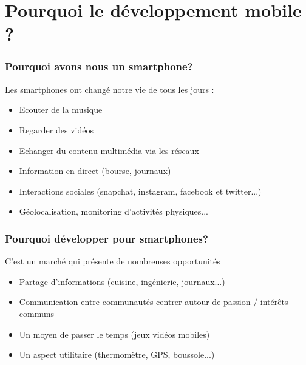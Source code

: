 \documentclass{beamer}
\begin{document}
\section{Pourquoi le développement mobile ?}
\begin{frame}
\frametitle{Pourquoi avons nous un smartphone?}

\begin{block}{Les smartphones ont changé notre vie de tous les jours :}

	\begin{itemize}
		\item Ecouter de la musique
		\item Regarder des vidéos
		\item Echanger du contenu multimédia via les réseaux
		\item Information en direct (bourse, journaux)
		\item Interactions sociales (snapchat, instagram, facebook et twitter...)
		\item Géolocalisation, monitoring d'activités physiques...
	\end{itemize}

\end{block}

\end{frame}
\begin{frame}
\frametitle{Pourquoi développer pour smartphones?}

\begin{block}{C'est un marché qui présente de nombreuses opportunités}

\begin{itemize}
	\item Partage d'informations (cuisine, ingénierie, journaux...)
	\item Communication entre communautés centrer autour de passion / intérêts communs
	\item Un moyen de passer le temps (jeux vidéos mobiles)
	\item Un aspect utilitaire (thermomètre, GPS, boussole...)
\end{itemize}

\end{block}

\end{frame}
\end{document}
